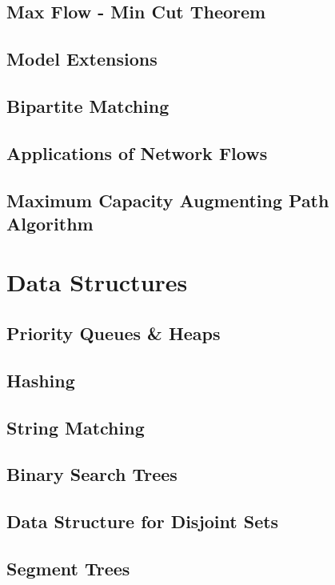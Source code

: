 \documentclass{article}
\begin{document}
\subsection{Max Flow - Min Cut Theorem}
\subsection{Model Extensions}
\subsection{Bipartite Matching}
\subsection{Applications of Network Flows}
\subsection{Maximum Capacity Augmenting Path Algorithm}
\newpage


\section{Data Structures}
\subsection{Priority Queues \& Heaps}
\subsection{Hashing}
\subsection{String Matching}
\subsection{Binary Search Trees}
\subsection{Data Structure for Disjoint Sets}
\subsection{Segment Trees}
\newpage

\end{document}
